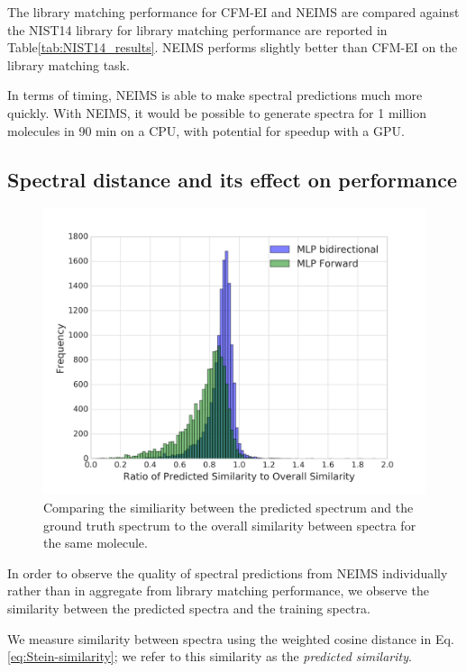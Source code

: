 The library matching performance for CFM-EI and NEIMS are compared against the NIST14 library for library matching performance are reported in Table\ref{tab:NIST14_results}. NEIMS performs slightly better than CFM-EI on the library matching task. 

In terms of timing, NEIMS is able to make spectral predictions much more quickly. With NEIMS, it would be possible to generate spectra for 1 million molecules in 90 min on a CPU, with potential for speedup with a GPU. 


\subsection{Spectral distance and its effect on performance}

\begin{figure}[h]
    \centering
    \includegraphics[scale=0.4]{predicted_similarity_overall_similarity_ratio.png}
        \caption[Similarity Analysis of NEIMS predicted spectra to spectra self-similarity]{Comparing the similiarity between the predicted spectrum and the ground truth spectrum to the overall similarity between spectra for the same molecule. }
    \label{fig:similarity_analysis}
\end{figure}

In order to observe the quality of spectral predictions from NEIMS individually rather than in aggregate from library matching performance, we observe the similarity between the predicted spectra and the training spectra.

We measure similarity between spectra using the weighted cosine distance in Eq. \ref{eq:Stein-similarity}; we refer to this similarity as the \textit{predicted similarity}.


